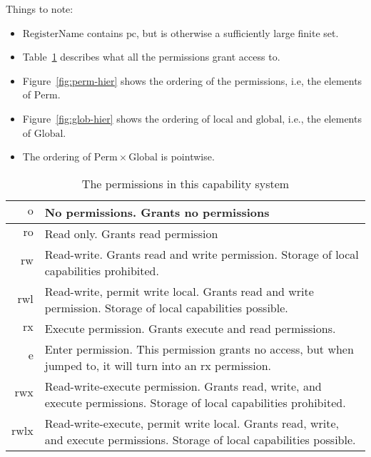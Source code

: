 \documentclass[a4paper]{article}
\newcommand{\pcreg}{\mathrm{pc}}
\newcommand{\plaindom}[1]{\mathrm{#1}}
\newcommand{\RegName}{\plaindom{RegisterName}}
\newcommand{\Perms}{\plaindom{Perm}}
\newcommand{\Globals}{\plaindom{Global}}
\newcommand{\plainperm}[1]{\mathrm{#1}}
\newcommand{\noperm}{\plainperm{o}}
\newcommand{\readonly}{\plainperm{ro}}
\newcommand{\readwrite}{\plainperm{rw}}
\newcommand{\exec}{\plainperm{rx}}
\newcommand{\entry}{\plainperm{e}}
\newcommand{\rwx}{\plainperm{rwx}}
\newcommand{\readwritel}{\plainperm{rwl}}
\newcommand{\rwlx}{\plainperm{rwlx}}
\newcommand{\local}{\plainperm{local}}
\newcommand{\glob}{\plainperm{global}}
\begin{document}
Things to note:
\begin{itemize}
\item $\RegName$ contains $\pcreg$, but is otherwise a sufficiently
  large finite set.
\item Table~\ref{tab:permission-list} describes what all the permissions grant access to.
\item Figure~\ref{fig:perm-hier} shows the ordering of the permissions, i.e, the elements of $\Perms$.
\item Figure~\ref{fig:glob-hier} shows the ordering of $\local$ and $\glob$, i.e., the elements of $\Globals$.
\item The ordering of $\Perms \times \Globals$ is pointwise.
\end{itemize}

\begin{table}[!h]
  \centering
  \begin{tabular}[!h]{r |  p{7cm} }
    $\noperm$ & No permissions. Grants no permissions\\
    \hline
    $\readonly$ & Read only. Grants read permission \\
    \hline
    $\readwrite$ & Read-write. Grants read and write permission. Storage of local capabilities prohibited. \\
    \hline
    $\readwritel$ & Read-write, permit write local. Grants read and write permission. Storage of local capabilities possible. \\
    \hline
    $\exec$ & Execute permission. Grants execute and read permissions.\\
    \hline
    $\entry$ & Enter permission. This permission grants no access, but when jumped to, it will turn into an $\exec$ permission.\\
    \hline
    $\rwx$ & Read-write-execute permission. Grants read, write, and execute permissions. Storage of local capabilities prohibited. \\
    \hline
    $\rwlx$ & Read-write-execute, permit write local. Grants read, write, and execute permissions. Storage of local capabilities possible.
  \end{tabular}

  \caption{The permissions in this capability system}
  \label{tab:permission-list}
\end{table}
\end{document}
